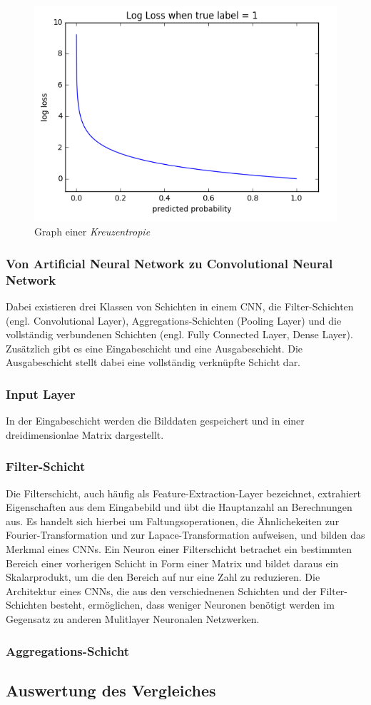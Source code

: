 \begin{figure}[H]
	\centering
	\includegraphics[width=\imgMed]{images/theory/cross_entropy.png}
	\caption{Graph einer \textit{Kreuzentropie} \cite{fortuna_viana_2019}} 
	\label{fig:crossentropy}
\end{figure}

\subsubsection*{Von Artificial Neural Network zu Convolutional Neural Network}

Dabei existieren drei Klassen von Schichten in einem CNN, die Filter-Schichten (engl. Convolutional Layer), Aggregations-Schichten (Pooling Layer) und die vollständig verbundenen Schichten (engl. Fully Connected Layer, Dense Layer). 
Zusätzlich gibt es eine Eingabeschicht und eine Ausgabeschicht. Die Ausgabeschicht stellt dabei eine vollständig verknüpfte Schicht dar.

\subsubsection{Input Layer}
In der Eingabeschicht werden die Bilddaten gespeichert und in einer dreidimensionlae Matrix dargestellt.

\subsubsection{Filter-Schicht}
Die Filterschicht, auch häufig als Feature-Extraction-Layer bezeichnet, extrahiert Eigenschaften aus dem Eingabebild und übt die Hauptanzahl an Berechnungen aus. 
Es handelt sich hierbei um Faltungsoperationen, die Ähnlichekeiten zur Fourier-Transformation und zur Lapace-Transformation aufweisen, und bilden das Merkmal eines CNNs.
Ein Neuron einer Filterschicht betrachet ein bestimmten Bereich einer vorherigen Schicht in Form einer Matrix und bildet daraus ein Skalarprodukt, um die den Bereich auf nur eine Zahl zu reduzieren.
Die Architektur eines CNNs, die aus den verschiednenen Schichten und der Filter-Schichten besteht, ermöglichen, dass weniger Neuronen benötigt werden im Gegensatz zu anderen Mulitlayer Neuronalen Netzwerken.

\subsubsection{Aggregations-Schicht}



\subsection{Auswertung des Vergleiches}
